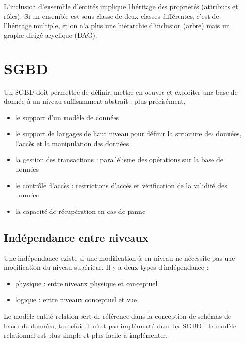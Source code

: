 		
		L'inclusion d'ensemble d'entités implique l'héritage des propriétés (attributs et rôles). Si un ensemble est sous-classe de deux classes différentes, c'est de l'héritage multiple, et on n'a plus une hiérarchie d'inclusion (arbre) mais un graphe dirigé acyclique (DAG).
		
	\section{SGBD}
	
	Un SGBD doit permettre de définir, mettre en oeuvre et exploiter une base de donnée à un niveau suffisamment abstrait ; plus précisément,
	
	\begin{itemize}
		\item le support d'un modèle de données
		\item le support de langages de haut niveau pour définir la structure des données, l'accès et la manipulation des données
		\item la gestion des transactions : parallélisme des opérations sur la base de données
		\item le contrôle d'accès : restrictions d'accès et vérification de la validité des données
		\item la capacité de récupération en cas de panne
	\end{itemize}
	
	
		\subsection{Indépendance entre niveaux}
		
		Une indépendance existe si une modification à un niveau ne nécessite pas une modification du niveau supérieur. Il y a deux types d'indépendance :
		
		\begin{itemize}
			\item physique : entre niveaux physique et conceptuel
			\item logique : entre niveaux conceptuel et vue
		\end{itemize}
		
		Le modèle entité-relation sert de référence dans la conception de schémas de bases de données, toutefois il n'est pas implémenté dans les SGBD : le modèle relationnel est plus simple et plus facile à implémenter.